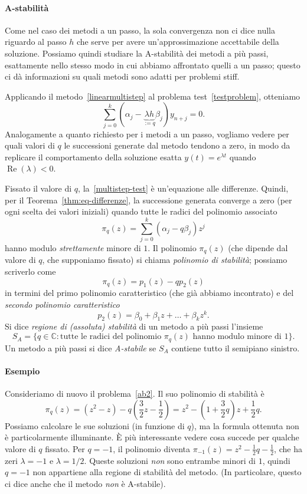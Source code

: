\documentclass[a4paper]{report}
\theoremstyle{definiton}
\theoremstyle{remark}
\begin{document}
\paragraph{A-stabilità}

Come nel caso dei metodi a un passo, la sola convergenza non ci dice nulla riguardo al passo $h$ che serve per avere un'approssimazione accettabile della soluzione. Possiamo quindi studiare la A-stabilità dei metodi a più passi, esattamente nello stesso modo in cui abbiamo affrontato quelli a un passo; questo ci dà informazioni su quali metodi sono adatti per problemi stiff.

Applicando il metodo~\eqref{linearmultistep} al problema test~\eqref{testproblem}, otteniamo
\begin{equation} \label{multistep-test}
    \sum_{j=0}^k (\alpha_j - \underbrace{\lambda h}_{:=q} \beta_j) y_{n+j} = 0.    
\end{equation}
Analogamente a quanto richiesto per i metodi a un passo, vogliamo vedere per quali valori di $q$ le successioni generate dal metodo tendono a zero, in modo da replicare il comportamento della soluzione esatta $y(t) = e^{\lambda t}$ quando $\operatorname{Re}(\lambda) < 0$.

Fissato il valore di $q$, la~\eqref{multistep-test} è un'equazione alle differenze. Quindi, per il Teorema~\ref{thm:eq-differenze}, la successione generata converge a zero (per ogni scelta dei valori iniziali) quando tutte le radici del polinomio associato
\[
\pi_q(z) = \sum_{j=0}^k (\alpha_j - q\beta_j) z^j
\]
hanno modulo \emph{strettamente} minore di $1$. Il polinomio $\pi_q(z)$ (che dipende dal valore di $q$, che supponiamo fissato) si chiama \emph{polinomio di stabilità}; possiamo scriverlo come
\[
\pi_q(z) = p_1(z) - q p_2(z)
\]
in termini del primo polinomio caratteristico (che già abbiamo incontrato) e del \emph{secondo polinomio caratteristico}
\[
p_2(z) = \beta_0 + \beta_1 z + \dots + \beta_k z^k.
\]
Si dice \emph{regione di (assoluta) stabilità} di un metodo a più passi l'insieme
\[
  S_A = \{q \in \mathbb{C} \colon \text{tutte le radici del polinomio $\pi_q(z)$ hanno modulo minore di $1$}\}.
\]
Un metodo a più passi si dice \emph{A-stabile} se $S_A$ contiene tutto il semipiano sinistro. 

\paragraph{Esempio} Consideriamo di nuovo il problema~\eqref{ab2}. Il suo polinomio di stabilità è 
\[
    \pi_q(z) = (z^2 -z) - q\left(\frac{3}{2}z - \frac{1}{2}\right) = z^2 - \left(1+\frac32 q\right) z + \frac12 q.
\]
Possiamo calcolare le sue soluzioni (in funzione di $q$), ma la formula ottenuta non è particolarmente illuminante. È più interessante vedere cosa succede per qualche valore di $q$ fissato. Per $q=-1$, il polinomio diventa $\pi_{-1}(z) = z^2 - \frac12 q - \frac12$, che ha zeri $\lambda=-1$ e $\lambda=1/2$. Queste soluzioni \emph{non} sono entrambe minori di $1$, quindi $q=-1$ non appartiene alla regione di stabilità del metodo. (In particolare, questo ci dice anche che il metodo \emph{non} è A-stabile).
\end{document}

